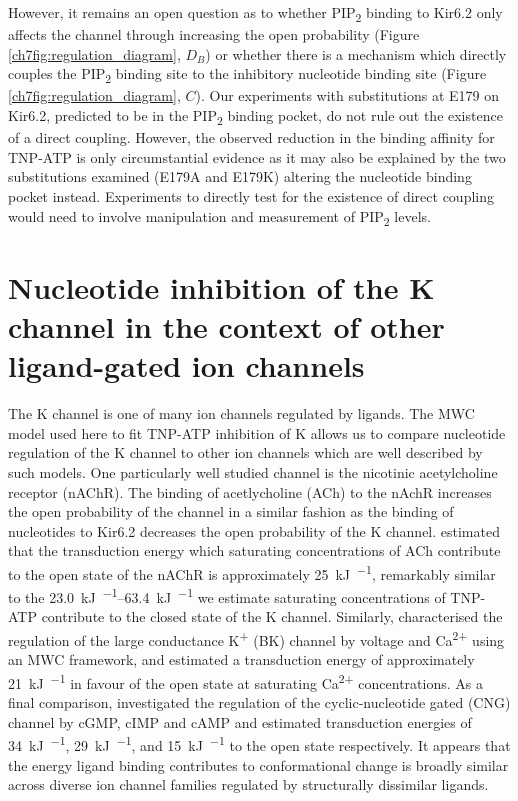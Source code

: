 However, it remains an open question as to whether PIP\textsubscript{2} binding to Kir6.2 only affects the channel through increasing the open probability (Figure \ref{ch7fig:regulation_diagram}, $D_B$) or whether there is a mechanism which directly couples the PIP\textsubscript{2} binding site to the inhibitory nucleotide binding site (Figure \ref{ch7fig:regulation_diagram}, $C$).
Our experiments with substitutions at E179 on Kir6.2, predicted to be in the PIP\textsubscript{2} binding pocket, do not rule out the existence of a direct coupling.
However, the observed reduction in the binding affinity for TNP-ATP is only circumstantial evidence as it may also be explained by the two substitutions examined (E179A and E179K) altering the nucleotide binding pocket instead.
Experiments to directly test for the existence of direct coupling would need to involve manipulation and measurement of PIP\textsubscript{2} levels.

\section{Nucleotide inhibition of the K\ATP{} channel in the context of other ligand-gated ion channels}

The K\ATP{} channel is one of many ion channels regulated by ligands.
The MWC model used here to fit TNP-ATP inhibition of K\ATP{} allows us to compare nucleotide regulation of the K\ATP{} channel to other ion channels which are well described by such models.
One particularly well studied channel is the nicotinic acetylcholine receptor (nAChR).
The binding of acetlycholine (ACh) to the nAchR increases the open probability of the channel in a similar fashion as the binding of nucleotides to Kir6.2 decreases the open probability of the K\ATP{} channel.
\textcite{auerbach_thinking_2012} estimated that the transduction energy which saturating concentrations of ACh contribute to the open state of the nAChR is approximately \SI{25}{\kilo\joule\per\Molar}, remarkably similar to the \SIrange{23.0}{63.4}{\kilo\joule\per\Molar} we estimate saturating concentrations of TNP-ATP contribute to the closed state of the K\ATP{} channel.
Similarly, \textcite{horrigan_coupling_2002} characterised the regulation of the large conductance K\textsuperscript{+} (BK) channel by voltage and Ca\textsuperscript{2+} using an MWC framework, and estimated a transduction energy of approximately \SI{21}{\kilo\joule\per\Molar} in favour of the open state at saturating Ca\textsuperscript{2+} concentrations.
As a final comparison, \textcite{varnum_subunit_1996} investigated the regulation of the cyclic-nucleotide gated (CNG) channel by cGMP, cIMP and cAMP and estimated transduction energies of \SI{34}{\kilo\joule\per\Molar}, \SI{29}{\kilo\joule\per\Molar}, and \SI{15}{\kilo\joule\per\Molar} to the open state respectively.
It appears that the energy ligand binding contributes to conformational change is broadly similar across diverse ion channel families regulated by structurally dissimilar ligands.

